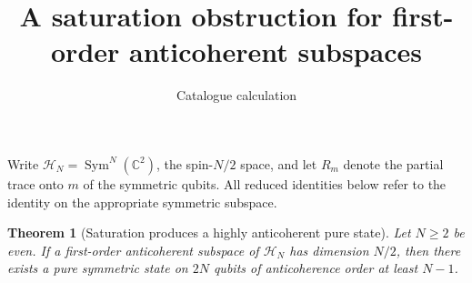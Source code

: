 \documentclass[11pt]{article}
\newtheorem{theorem}{Theorem}
\newcommand{\Sym}{\operatorname{Sym}}
\begin{document}
\title{A saturation obstruction for first-order anticoherent subspaces}
\author{Catalogue calculation}
\date{}
\maketitle
Write $\mathcal H_N=\Sym^N(\mathbb C^2)$, the spin-$N/2$ space, and let $R_m$ denote the partial trace onto $m$ of the symmetric qubits. All reduced identities below refer to the identity on the appropriate symmetric subspace.

\begin{theorem}[Saturation produces a highly anticoherent pure state]
Let $N\ge2$ be even. If a first-order anticoherent subspace of $\mathcal H_N$ has dimension $N/2$, then there exists a pure symmetric state on $2N$ qubits of anticoherence order at least $N-1$.
\end{theorem}
\end{document}
